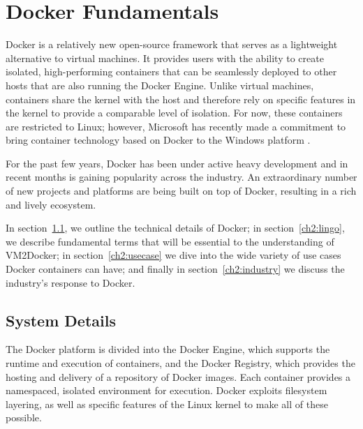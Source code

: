 \chapter{Docker Fundamentals}
\label{chap:docker}

Docker is a relatively new open-source framework that serves as a lightweight alternative to virtual machines. It provides users with the ability to create isolated, high-performing containers that can be seamlessly deployed to other hosts that are also running the Docker Engine. Unlike virtual machines, containers share the kernel with the host and therefore rely on specific features in the kernel to provide a comparable level of isolation. For now, these containers are restricted to Linux; however, Microsoft has recently made a commitment to bring container technology based on Docker to the Windows platform \cite{windows-docker}.

For the past few years, Docker has been under active heavy development and in recent months is gaining popularity across the industry. An extraordinary number of new projects and platforms are being built on top of Docker, resulting in a rich and lively ecosystem. 


In section~\ref{ch2:system}, we outline the technical details of Docker; in section~\ref{ch2:lingo}, we describe fundamental terms that will be essential to the understanding of VM2Docker; in section~\ref{ch2:usecase} we dive into the wide variety of use cases Docker containers can have; and finally in section~\ref{ch2:industry} we discuss the industry's response to Docker.

\section{System Details}\label{ch2:system}
The Docker platform is divided into the Docker Engine, which supports the runtime and execution of containers, and the Docker Registry, which provides the hosting and delivery of a repository of Docker images. Each container provides a namespaced, isolated environment for execution. Docker exploits filesystem layering, as well as specific features of the Linux kernel to make all of these possible.

